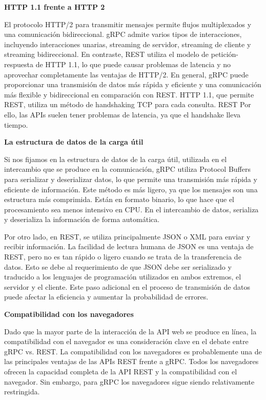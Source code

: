 \textbf{HTTP 1.1 frente a HTTP 2}

El protocolo HTTP/2 para transmitir mensajes permite flujos multiplexados y una comunicación bidireccional. gRPC admite varios tipos de interacciones, incluyendo interacciones unarias, streaming de servidor, streaming de cliente y streaming bidireccional. En contraste, REST utiliza el modelo de petición-respuesta de HTTP 1.1, lo que puede causar problemas de latencia y no aprovechar completamente las ventajas de HTTP/2. En general, gRPC puede proporcionar una transmisión de datos más rápida y eficiente y una comunicación más flexible y bidireccional en comparación con REST. HTTP 1.1, que permite REST, utiliza un método de handshaking TCP para cada consulta. REST Por ello, las APIs suelen tener problemas de latencia, ya que el handshake lleva tiempo.

\textbf{La estructura de datos de la carga útil}

Si nos fijamos en la estructura de datos de la carga útil, utilizada en el intercambio que se produce en la comunicación, gRPC utiliza Protocol Buffers para serializar y deserializar datos, lo que permite una transmisión más rápida y eficiente de información. Este método es más ligero, ya que los mensajes son una estructura más comprimida. Están en formato binario, lo que hace que el procesamiento sea menos intensivo en CPU. En el intercambio de datos, serializa y deserializa la información de forma automática.

Por otro lado, en REST, se utiliza principalmente JSON o XML para enviar y recibir información. La facilidad de lectura humana de JSON es una ventaja de REST, pero no es tan rápido o ligero cuando se trata de la transferencia de datos. Esto se debe al requerimiento de que JSON debe ser serializado y traducido a los lenguajes de programación utilizados en ambos extremos, el servidor y el cliente. Este paso adicional en el proceso de transmisión de datos puede afectar la eficiencia y aumentar la probabilidad de errores.


\textbf{Compatibilidad con los navegadores}\label{GRPCcompatibilidadConNavegadores}

Dado que la mayor parte de la interacción de la API web se produce en línea, la compatibilidad con el navegador es una consideración clave en el debate entre gRPC vs. REST. La compatibilidad con los navegadores es probablemente una de las principales ventajas de las APIs REST frente a gRPC. Todos los navegadores ofrecen la capacidad completa de la API REST y la compatibilidad con el navegador. Sin embargo, para gRPC los navegadores sigue siendo relativamente restringida.

